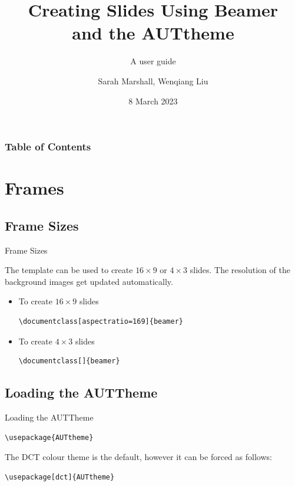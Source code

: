 \documentclass[aspectratio=169, 12pt]{beamer}    %
\title[Beamer title]
{Creating Slides Using Beamer \\ and the AUTtheme
}
\subtitle{A user guide}
\author[Sarah, Wenqiang]{Sarah Marshall\inst{1}, Wenqiang Liu\inst{2}}
\institute
{\inst{1}  Engineering, Computer Mathematical Sciences (ECMS) \\
\inst{2}  Engineering, Computer Mathematical Sciences (ECMS) 
}
\date{
8 March 2023
}
\begin{document}
\begin{frame}
    \maketitle
\end{frame}


\begin{sectionframe}
\frametitle{Table of Contents}
\tableofcontents[hideallsubsections]
\end{sectionframe}



\section{Frames}


\subsection{Frame Sizes}
\begin{frame}[fragile = singleslide]{Frame Sizes}

The template can be used to create $16\times9$ or $4 \times 3$ slides.
The resolution of the background images get updated automatically.

\begin{itemize}
\item To create $16 \times 9$ slides
\begin{verbatim}
\documentclass[aspectratio=169]{beamer} 
\end{verbatim}

\item To create $4 \times 3$ slides
\begin{verbatim}
\documentclass[]{beamer}  
\end{verbatim}

\end{itemize} 


\end{frame}

\subsection{Loading the AUTTheme}
\begin{frame}[fragile = singleslide]{Loading the AUTTheme}
 
\begin{verbatim}
\usepackage{AUTtheme}  
\end{verbatim}

The DCT colour theme is the default, however it can be forced as follows:
\begin{verbatim}
\usepackage[dct]{AUTtheme}  
\end{verbatim}


\end{frame}
\end{document}
